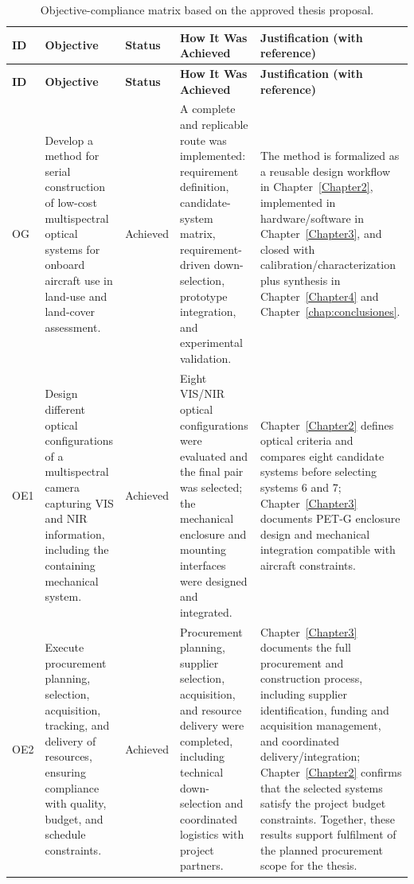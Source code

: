 \begingroup
\footnotesize
\renewcommand{\arraystretch}{1.2}
\setlength{\tabcolsep}{3pt}
\setlength{\LTleft}{0pt}
\setlength{\LTright}{0pt}
\begin{longtable}{|p{}|p{}|p{}|p{}|p{}|}
\caption{Objective-compliance matrix based on the approved thesis proposal.}
\label{tab:objective_compliance}\\
\hline
\rowcolor[HTML]{EFEFEF}\textbf{ID} & \textbf{Objective} & \textbf{Status} & \textbf{How It Was Achieved} & \textbf{Justification (with reference)} \\ \hline
\endfirsthead
\hline
\rowcolor[HTML]{EFEFEF}\textbf{ID} & \textbf{Objective} & \textbf{Status} & \textbf{How It Was Achieved} & \textbf{Justification (with reference)} \\ \hline
\endhead
OG & Develop a method for serial construction of low-cost multispectral optical systems for onboard aircraft use in land-use and land-cover assessment. & Achieved & A complete and replicable route was implemented: requirement definition, candidate-system matrix, requirement-driven down-selection, prototype integration, and experimental validation. & The method is formalized as a reusable design workflow in Chapter~\ref{Chapter2}, implemented in hardware/software in Chapter~\ref{Chapter3}, and closed with calibration/characterization plus synthesis in Chapter~\ref{Chapter4} and Chapter~\ref{chap:conclusiones}. \\ \hline
OE1 & Design different optical configurations of a multispectral camera capturing VIS and NIR information, including the containing mechanical system. & Achieved & Eight VIS/NIR optical configurations were evaluated and the final pair was selected; the mechanical enclosure and mounting interfaces were designed and integrated. & Chapter~\ref{Chapter2} defines optical criteria and compares eight candidate systems before selecting systems 6 and 7; Chapter~\ref{Chapter3} documents PET-G enclosure design and mechanical integration compatible with aircraft constraints. \\ \hline
OE2 & Execute procurement planning, selection, acquisition, tracking, and delivery of resources, ensuring compliance with quality, budget, and schedule constraints. & Achieved & Procurement planning, supplier selection, acquisition, and resource delivery were completed, including technical down-selection and coordinated logistics with project partners. & Chapter~\ref{Chapter3} documents the full procurement and construction process, including supplier identification, funding and acquisition management, and coordinated delivery/integration; Chapter~\ref{Chapter2} confirms that the selected systems satisfy the project budget constraints. Together, these results support fulfilment of the planned procurement scope for the thesis. \\ \hline

\end{longtable}
